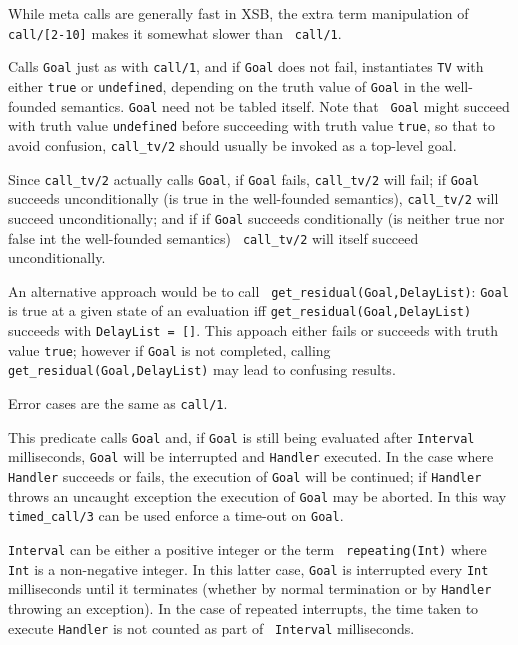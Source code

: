 \begin{description}
While meta calls are generally fast in XSB, the extra term
manipulation of {\tt call/[2-10]} makes it somewhat slower than {\tt
  call/1}.

%
Calls {\tt Goal} just as with {\tt call/1}, and if {\tt Goal} does not
fail, instantiates {\tt TV} with either {\tt true} or {\tt undefined},
depending on the truth value of {\tt Goal} in the well-founded
semantics.  {\tt Goal} need not be tabled itself.  Note that {\tt
  Goal} might succeed with truth value {\tt undefined} before
succeeding with truth value {\tt true}, so that to avoid confusion,
{\tt call\_tv/2} should usually be invoked as a top-level goal.

Since {\tt call\_tv/2} actually calls {\tt Goal}, if {\tt Goal} fails,
{\tt call\_tv/2} will fail; if {\tt Goal} succeeds unconditionally (is
true in the well-founded semantics), {\tt call\_tv/2} will succeed
unconditionally; and if if {\tt Goal} succeeds conditionally (is
neither true nor false int the well-founded semantics) {\tt
  call\_tv/2} will itself succeed unconditionally.

An alternative approach would be to call {\tt
  get\_residual(Goal,DelayList)}: {\tt Goal} is true at a given state
of an evaluation iff {\tt get\_residual(Goal,DelayList)} succeeds with
{\tt DelayList = []}.  This appoach either fails or succeeds with
truth value {\tt true}; however if {\tt Goal} is not completed,
calling {\tt get\_residual(Goal,DelayList)} may lead to confusing
results.

Error cases are the same as {\tt call/1}.

%
This predicate calls {\tt Goal} and, if {\tt Goal} is still being
evaluated after {\tt Interval} milliseconds, {\tt Goal} will be
interrupted and {\tt Handler} executed.  In the case where {\tt
  Handler} succeeds or fails, the execution of {\tt Goal} will be
continued; if {\tt Handler} throws an uncaught exception the execution
of {\tt Goal} may be aborted. In this way {\tt timed\_call/3} can be
used enforce a time-out on {\tt Goal}.  

{\tt Interval} can be either a positive integer or the term {\tt
  repeating(Int)} where {\tt Int} is a non-negative integer.  In this
latter case, {\tt Goal} is interrupted every {\tt Int} milliseconds
until it terminates (whether by normal termination or by {\tt Handler}
throwing an exception).  In the case of repeated interrupts, the time
taken to execute {\tt Handler} is not counted as part of {\tt
  Interval} milliseconds.


\end{description}
